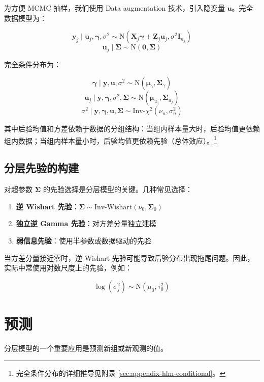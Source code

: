 为方便 MCMC 抽样，我们使用 Data augmentation 技术，引入隐变量 $\mathbf{u}$。完全数据模型为：

\[
\mathbf{y}_j \mid \mathbf{u}_j, \boldsymbol{\gamma}, \sigma^2 \sim \mathrm{N}\left(\mathbf{X}_j\boldsymbol{\gamma} + \mathbf{Z}_j\mathbf{u}_j, \sigma^2 \mathbf{I}_{n_j}\right)
\]
\[
\mathbf{u}_j \mid \boldsymbol{\Sigma} \sim \mathrm{N}(\mathbf{0}, \boldsymbol{\Sigma})
\]

完全条件分布为：

\[
\boldsymbol{\gamma} \mid \mathbf{y}, \mathbf{u}, \sigma^2 \sim \mathrm{N}(\boldsymbol{\mu}_\gamma, \boldsymbol{\Sigma}_\gamma)
\]
\[
\mathbf{u}_j \mid \mathbf{y}, \boldsymbol{\gamma}, \sigma^2, \boldsymbol{\Sigma} \sim \mathrm{N}(\boldsymbol{\mu}_{u_j}, \boldsymbol{\Sigma}_{u_j})
\]
\[
\sigma^2 \mid \mathbf{y}, \boldsymbol{\gamma}, \mathbf{u}, \boldsymbol{\Sigma} \sim \text{Inv-}\chi^2(\nu_n, \sigma_n^2)
\]

其中后验均值和方差依赖于数据的分组结构：当组内样本量大时，后验均值更依赖组内数据；当组内样本量小时，后验均值更依赖先验（总体效应）。\footnote{完全条件分布的详细推导见附录 \cref{sec:appendix-hlm-conditional}。}

\subsection{分层先验的构建}
\label{sec:hierarchical-prior}

对超参数 $\boldsymbol{\Sigma}$ 的先验选择是分层模型的关键。几种常见选择：

\begin{enumerate}
  \item \textbf{逆 Wishart 先验}：$\boldsymbol{\Sigma} \sim \text{Inv-Wishart}(\nu_0, \boldsymbol{\Sigma}_0)$
  \item \textbf{独立逆 Gamma 先验}：对方差分量独立建模
  \item \textbf{弱信息先验}：使用半参数或数据驱动的先验
\end{enumerate}

当方差分量接近零时，逆 Wishart 先验可能导致后验分布出现拖尾问题。因此，实际中常使用对数尺度上的先验，例如：

\[
\log(\sigma_j^2) \sim \mathrm{N}(\mu_0, \tau_0^2)
\]

\section{预测}
\label{sec:prediction-hlm}

分层模型的一个重要应用是预测新组或新观测的值。

